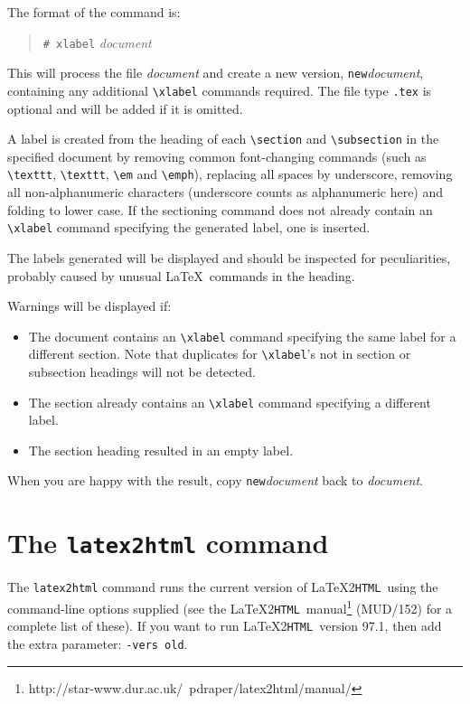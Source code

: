 \documentclass[twoside,11pt]{article}
\newcommand{\htmladdnormallinkfoot}[2]{#1\footnote{#2}}
\newcommand{\latex}[1]{#1}
\newcommand{\xlabel}[1]{}
\newcommand{\latextohtml}{\LaTeX2\texttt{HTML}}
\renewcommand{\_}{\texttt{\symbol{95}}}
\newcommand{\LtoHManURL}{http://star-www.dur.ac.uk/~{}pdraper/latex2html/manual/}
\begin{document}
The format of the command is:
\begin{quote}
\verb+# xlabel+ \textit{document}
\end{quote}

This will process the file \textit{document} and create a new version,
\texttt{new}\textit{document}, containing any additional \verb+\xlabel+
commands required. The file type \texttt{.tex} is optional and will be added
if it is omitted.

A label is created from the heading of each \verb+\section+ and
\verb+\subsection+ in the specified document by removing common font-changing
commands (such as \verb+\texttt+, \verb+\texttt+, \verb+\em+ and \verb+\emph+),
replacing all spaces by underscore, removing all non-alphanumeric characters
(underscore counts as alphanumeric here) and folding to lower case.
If the sectioning command does not already contain an \verb+\xlabel+ command
specifying the generated label, one is inserted.

The labels generated will be displayed and should be inspected for
peculiarities, probably caused by unusual \LaTeX\ commands in the heading.

Warnings will be displayed if:
\begin{itemize}
\item The document contains an \verb+\xlabel+ command specifying the same
label for a different section. Note that duplicates for \verb+\xlabel+'s not
in section or subsection headings will not be detected.
\item The section already contains an \verb+\xlabel+ command specifying
a different label.
\item The section heading resulted in an empty label.
\end{itemize}

When you are happy with the result, copy \texttt{new}\textit{document} back to
\textit{document}.

\section{\xlabel{the_latex2html_command}\label{latex2html_command}
         The \texttt{latex2html} command} 
The \verb#latex2html# command runs the current version of
\latextohtml\ using the command-line options supplied (see the
\latextohtml\ \htmladdnormallinkfoot{manual}{\LtoHManURL}
\latex{(MUD/152)}  for a complete list of these). If you want to run
\latextohtml\ version 97.1, then add the extra parameter: \verb#-vers old#.
\end{document}
